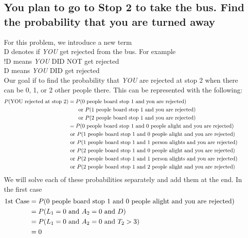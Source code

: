 \documentclass{article}
\numberwithin{equation}{section}
\newcommand{\eqname}[1]{\tag*{#1}}%
\begin{document}
\subsection{You plan to go to Stop 2 to take the bus. Find the probability that you are turned away}

For this problem, we introduce a new term 
\\ \indent D denotes if \textit{YOU} get rejected from the bus. For example \\
\indent \indent !D means \textit{YOU} DID NOT get rejected \\
\indent \indent D means \textit{YOU} DID get rejected \\
Our goal if to find the probability that \textit{YOU} are rejected at stop 2 when there can be 0, 1, or 2 other people there. This can be represented with the following:
\begin{align} 
	    \label{Probability YOU are rejected}
		P(\text{YOU rejected at stop 2)} &= P(\text{0 people board stop 1 and you are rejected}) \eqname{} \\
		& \indent \text{  or } P(\text{1 people board stop 1 and you are rejected}) \eqname{} \\
		& \indent \text{  or } P(\text{2 people board stop 1 and you are rejected}) \eqname{} \\
		&= P(\text{0 people board stop 1 and 0 people alight and you are rejected}) \eqname{} \\
		& \text{  or } P(\text{1 people board stop 1 and 0 people alight and you are rejected}) \eqname{} \\
    	& \text{  or } P(\text{1 people board stop 1 and 1 person alights and you are rejected}) \eqname{} \\
		& \text{  or } P(\text{2 people board stop 1 and 0 people alight and you are rejected}) \eqname{} \\
    	& \text{  or } P(\text{2 people board stop 1 and 1 person alights and you are rejected}) \eqname{} \\		
		& \text{  or } P(\text{2 people board stop 1 and 2 people alight and you are rejected}) \eqname{} \\
\end{align}
We will solve each of these probabilities separately and add them at the end. In the first case
\begin{align} 
	    \label{1st Case}
		\text{1st Case} &= P(\text{0 people board stop 1 and 0 people alight and you are rejected}) \eqname{} \\
		&= P(L\textsubscript{1} = 0 \text{ and } A\textsubscript{2} = 0 \text{ and } D) \eqname{} \\
		&= P(L_1 = 0 \text{ and } A_2 = 0 \text{ and } T_2 > 3) \eqname{} \\
		&= 0 \eqname{} \\
\end{align}
\end{document}
